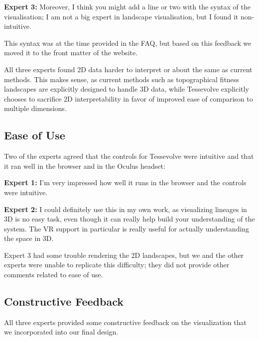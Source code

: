 \begin{displayquote}

\textbf{Expert 3:} Moreover, I think you might add a line or two with the syntax of the visualisation; I am not a big expert in landscape visualisation, but I found it non-intuitive.

\end{displayquote}

This syntax was at the time provided in the FAQ, but based on this feedback we moved it to the front matter of the website.

All three experts found 2D data harder to interpret or about the same as current methods. This makes sense, as current methods such as topographical fitness landscapes are explicitly designed to handle 3D data, while Tessevolve explicitly chooses to sacrifice 2D interpretability in favor of improved ease of comparison to multiple dimensions. 

\subsection{Ease of Use}

Two of the experts agreed that the controls for Tessevolve were intuitive and that it ran well in the browser and in the Oculus headset:

\begin{displayquote}

\textbf{Expert 1:} I'm very impressed how well it runs in the browser and the controls were intuitive. 

\textbf{Expert 2:} I could definitely use this in my own work, as visualizing lineages in 3D is no easy task, even though it can really help build your understanding of the system. The VR support in particular is really useful for actually understanding the space in 3D.

\end{displayquote}

Expert 3 had some trouble rendering the 2D landscapes, but we and the other experts were unable to replicate this difficulty; they did not provide other comments related to ease of use.

\subsection{Constructive Feedback}

All three experts provided some constructive feedback on the visualization that we incorporated into our final design. 

